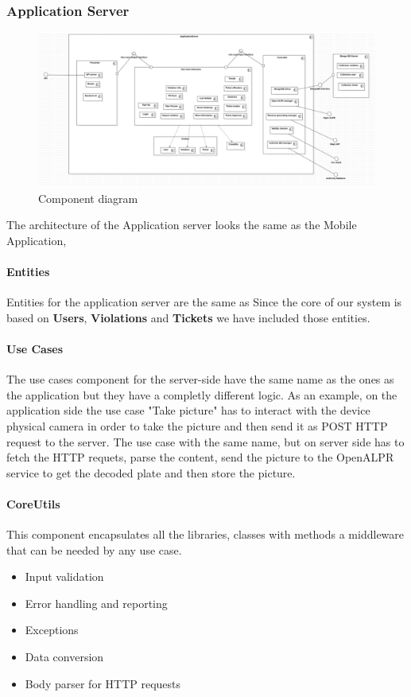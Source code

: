 \subsubsection{Application Server} \label{API}
\begin{figure}
\centering
\includegraphics[width=\textwidth]{Images/ComponentDiagram2.png}
\caption{\label{fig:compdiag} Component diagram}
\end{figure}

The architecture of the Application server looks the same as the Mobile Application,

\paragraph{Entities}
Entities for the application server are the same as
Since the core of our system is based on \textbf{Users}, \textbf{Violations} and \textbf{Tickets} we have included those entities.


\paragraph{Use Cases}
The use cases component for the server-side have the same name as the ones as the application but they have a completly different logic. As an example, on the application side the use case "Take picture" has to interact with the device physical camera in order to take the picture and then send it as POST HTTP request to the server. The use case with the same name, but on server side has to fetch the HTTP requets, parse the content, send the picture to the OpenALPR service to get the decoded plate and then store the picture.

\paragraph{CoreUtils}
This component encapsulates all the libraries, classes with methods a middleware that can be needed by any use case.
\begin{itemize}
  \item Input validation
  \item Error handling and reporting
  \item Exceptions
  \item Data conversion
  \item Body parser for HTTP requests
\end{itemize}



